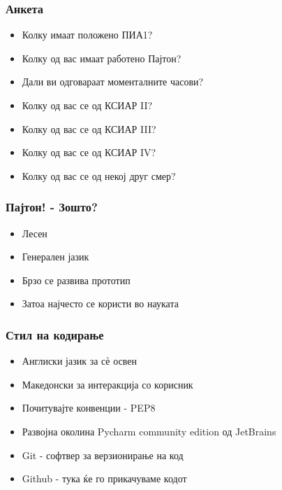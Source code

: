 \documentclass{beamer}
\begin{document}
\begin{frame}
\frametitle{Анкета}

\begin{itemize}

\item Колку имаат положено ПИА1?

\item Колку од вас имаат работено Пајтон?

\item Дали ви одговараат моменталните часови?

\item Колку од вас се од КСИАР II?

\item Колку од вас се од КСИАР III?

\item Колку од вас се од КСИАР IV?

\item Колку од вас се од некој друг смер?

\end{itemize}

\end{frame}


\begin{frame}
\frametitle{Пајтон! - Зошто?}

\begin{itemize}

\item Лесен

\item Генерален јазик

\item Брзо се развива прототип

\item Затоа најчесто се користи во науката

\end{itemize}

\end{frame}


\begin{frame}
\frametitle{Стил на кодирање}

\begin{itemize}

\item Англиски јазик за с\`е освен

\item Македонски за интеракција со корисник

\item Почитувајте конвенции - PEP8

\item Развојна околина Pycharm community edition од JetBrains

\item Git - софтвер за верзионирање на код

\item Github - тука ќе го прикачуваме кодот

\end{itemize}

\end{frame}
\end{document}
